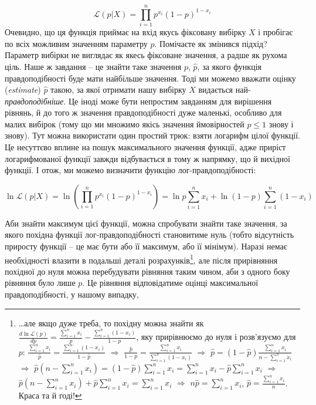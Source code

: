 \documentclass[
  11pt,
]{book}
\begin{document}
\[\mathcal{L}(p|X) = \prod \limits_{i = 1}^n p^{x_i} (1 - p)^{1-x_i}\]
Очевидно, що ця функція приймає на вхід якусь фіксовану вибірку \(X\) і пробігає по всіх можливим значенням параметру \(p\). Помічаєте як змінився підхід? Параметр вибірки не виглядає як якесь фіксоване значення, а радше як рухома ціль. Наше ж завдання -- це знайти таке значення \(p\), \(\hat{p}\), за якого функція правдоподібності буде мати найбільше значення. Тоді ми можемо вважати оцінку (\emph{estimate}) \(\hat{p}\) такою, за якої отримати нашу вибірку \(X\) видається най-\emph{правдоподібніше}. Це іноді може бути непростим завданням для вирішення рівнянь, й до того ж значення правдоподібності дуже маленькі, особливо для малих вибірок (тому що ми множимо якісь значення ймовірностей \(p \leq 1\) знову і знову). Тут можна використати один простий трюк: взяти логарифм цілої функції. Це несуттєво вплине на пошук максимального значення функції, адже приріст логарифмованої функції завжди відбувається в тому ж напрямку, що й вихідної функції. І отож, ми можемо визначити функцію лог-правдоподібності:

\[\ln \mathcal{L}(p|X) = \ln \left( \prod \limits_{i = 1}^n p^{x_i} (1 - p)^{1-x_i} \right) = \ln p \sum \limits_{i=1}^n x_i + \ln (1-p) \sum \limits_{i=1}^n (1 - x_i)\]

Аби знайти максимум цієї функції, можна спробувати знайти таке значення, за якого похідна функції лог-правдоподібності становитиме нуль (тобто відсутність приросту функції -- це має бути або її максимум, або її мінімум). Наразі немає необхідності влазити в подальші деталі розрахунків\footnote{\ldots але якщо дуже треба, то похідну можна знайти як \(\frac{d \ln \mathcal{L} (p)}{d p} = \frac{\sum_{i=1}^n x_i}{p} - \frac{\sum_{i=1}^n (1 - x_i)}{1-p}\), яку прирівнюємо до нуля і розв'язуємо для \(p\): \(\frac{\sum_{i=1}^n x_i}{\hat{p}} = \frac{\sum_{i=1}^n (1 - x_i)}{1-\hat{p}}\) \(\Rightarrow\) \(\frac{\hat{p}}{1 - p} = \frac{\sum_{i=1}^n x_i}{\sum_{i=1}^n (1 - x_i)}\) \(\Rightarrow\) \(\hat{p} = (1 - \hat{p}) \frac{\sum_{i=1}^n x_i}{n - \sum_{i=1}^n x_i}\) \(\Rightarrow\) \(\hat{p} (n - \sum_{i=1}^n x_i) = (1 - \hat{p}) \sum_{i=1}^n x_i = \sum_{i=1}^n x_i - \hat{p} \sum_{i=1}^n x_i\) \(\Rightarrow\) \(\hat{p} (n - \sum_{i=1}^n x_i) + \hat{p} \sum_{i=1}^n x_i = \sum_{i=1}^n x_i\) \(\Rightarrow\) \(n\hat{p} = \sum_{i=1}^n x_i\), \(\hat{p} = \frac{\sum_{i=1}^n x_i}{n}\). Краса та й годі!}, але після прирівняння похідної до нуля можна перебудувати рівняння таким чином, аби з одного боку рівняння було лише \(p\). Це рівняння відповідатиме оцінці максимальної правдоподібності, у нашому випадку,
\end{document}

